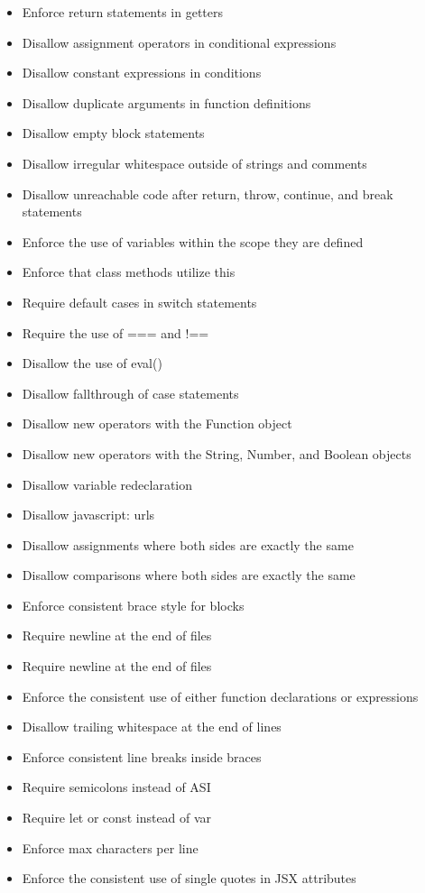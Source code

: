 \documentclass[a4paper]{article}
\begin{document}
\begin{itemize}
	\item Enforce return statements in getters
    \item Disallow assignment operators in conditional expressions
    \item Disallow constant expressions in conditions
    \item Disallow duplicate arguments in function definitions
    \item Disallow empty block statements
    \item Disallow irregular whitespace outside of strings and comments
    \item Disallow unreachable code after return, throw, continue, and break statements
    \item Enforce the use of variables within the scope they are defined
    \item Enforce that class methods utilize this
    \item Require default cases in switch statements
    \item Require the use of === and !==
    \item Disallow the use of eval()
    \item Disallow fallthrough of case statements
    \item Disallow new operators with the Function object
    \item Disallow new operators with the String, Number, and Boolean objects
    \item Disallow variable redeclaration
    \item Disallow javascript: urls
    \item Disallow assignments where both sides are exactly the same
    \item Disallow comparisons where both sides are exactly the same
    \item Enforce consistent brace style for blocks
    \item Require newline at the end of files
    \item Require newline at the end of files
    \item Enforce the consistent use of either function declarations or expressions
    \item Disallow trailing whitespace at the end of lines
    \item Enforce consistent line breaks inside braces
    \item Require semicolons instead of ASI
    \item Require let or const instead of var
    \item Enforce max characters per line
    \item Enforce the consistent use of single quotes in JSX attributes
\end{itemize}
\end{document}
